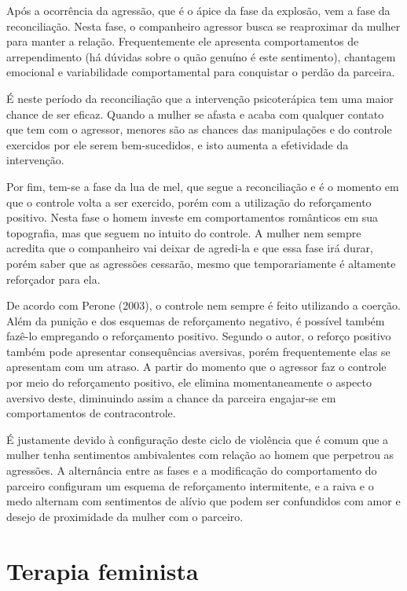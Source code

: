 Após a ocorrência da agressão, que é o ápice da fase da explosão, vem a fase da reconciliação. Nesta fase, o companheiro agressor busca se reaproximar da mulher para manter a relação. Frequentemente ele apresenta comportamentos de arrependimento (há dúvidas sobre o quão genuíno é este sentimento), chantagem emocional e variabilidade comportamental para conquistar o perdão da parceira.

É neste período da reconciliação que a intervenção psicoterápica tem uma maior chance de ser eficaz. Quando a mulher se afasta e acaba com qualquer contato que tem com o agressor, menores são as chances das manipulações e do controle exercidos por ele serem bem-sucedidos, e isto aumenta a efetividade da intervenção.

Por fim, tem-se a fase da lua de mel, que segue a reconciliação e é o momento em que o controle volta a ser exercido, porém com a utilização do reforçamento positivo. Nesta fase o homem investe em comportamentos românticos em sua topografia, mas que seguem no intuito do controle. A mulher nem sempre acredita que o companheiro vai deixar de agredi-la e que essa fase irá durar, porém saber que as agressões cessarão, mesmo que temporariamente é altamente reforçador para ela.

De acordo com Perone (2003), o controle nem sempre é feito utilizando a coerção. Além da punição e dos esquemas de reforçamento negativo, é possível também fazê-lo empregando o reforçamento positivo. Segundo o autor, o reforço positivo também pode apresentar consequências aversivas, porém frequentemente elas se apresentam com um atraso. A partir do momento que o agressor faz o controle por meio do reforçamento positivo, ele elimina momentaneamente o aspecto aversivo deste, diminuindo assim a chance da parceira engajar-se em comportamentos de contracontrole.

É justamente devido à configuração deste ciclo de violência que é comum que a mulher tenha sentimentos ambivalentes com relação ao homem que perpetrou as agressões. A alternância entre as fases e a modificação do comportamento do parceiro configuram um esquema de reforçamento intermitente, e a raiva e o medo alternam com sentimentos de alívio que podem ser confundidos com amor e desejo de proximidade da mulher com o parceiro.

\section*{Terapia feminista}

